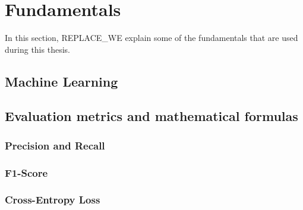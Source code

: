 \section{Fundamentals}

In this section, REPLACE_WE explain some of the fundamentals that are used during this thesis. 

\subsection{Machine Learning}

\subsection{Evaluation metrics and mathematical formulas}

\subsubsection{Precision and Recall}

\subsubsection{F1-Score}

\subsubsection{Cross-Entropy Loss}